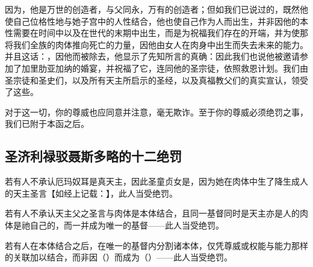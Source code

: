 因为，他是万世的创造者，与父同永，万有的创造者；但如我们已说过的，既然他使自己位格性地与她子宫中的人性结合，他也使自己作为人而出生，并非因他的本性需要在时间中以及在世代的末期中出生，而是为祝福我们存在的开端，并为使那将我们全族的肉体推向死亡的力量，因他由女人在肉身中出生而失去未来的能力。并且这话：，因他而被除去，他显示了先知所言的真确：因此我们也说他被邀请参加了加里肋亚加纳的婚宴，并祝福了它，连同他的圣宗徒，依照救恩计划。我们由圣宗徒和圣史们，以及所有天主所启示的圣经，以及真福教父们的真实宣认，领受了这些。\par

对于这一切，你的尊威也应同意并注意，毫无欺诈。至于你的尊威必须绝罚之事，我们已附于本函之后。\par


\subsection{圣济利禄驳聂斯多略的十二绝罚}

若有人不承认厄玛奴耳是真天主，因此圣童贞女是，因为她在肉体中生了降生成人的天主圣言【如经上记载：】，此人当受绝罚。\par

\par

若有人不承认天主父之圣言与肉体是本体结合，且同一基督同时是天主亦是人的肉体是祂自己的，而一并成为唯一的基督——此人当受绝罚。\par

\par

若有人在本体结合之后，在唯一的基督内分割诸本体，仅凭尊威或权能与能力那样的关联加以结合，而非因（）而成为（）——此人当受绝罚。\par

